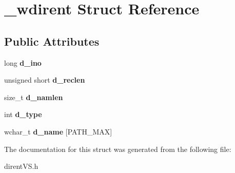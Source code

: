 \hypertarget{struct__wdirent}{}\section{\+\_\+wdirent Struct Reference}
\label{struct__wdirent}
\subsection*{Public Attributes}
\begin{DoxyCompactItemize}
\item 
long {\bfseries d\+\_\+ino}\hypertarget{struct__wdirent_ac8cfaf294a0b6a49287d3f384c280c93}{}\label{struct__wdirent_ac8cfaf294a0b6a49287d3f384c280c93}

\item 
unsigned short {\bfseries d\+\_\+reclen}\hypertarget{struct__wdirent_aff7f360608e576cd18cf11f2caf13ef3}{}\label{struct__wdirent_aff7f360608e576cd18cf11f2caf13ef3}

\item 
size\+\_\+t {\bfseries d\+\_\+namlen}\hypertarget{struct__wdirent_a0050d6131e6fa90206903e216b38799e}{}\label{struct__wdirent_a0050d6131e6fa90206903e216b38799e}

\item 
int {\bfseries d\+\_\+type}\hypertarget{struct__wdirent_a3c3874604ffccbeeaffd96709763cc3b}{}\label{struct__wdirent_a3c3874604ffccbeeaffd96709763cc3b}

\item 
wchar\+\_\+t {\bfseries d\+\_\+name} \mbox{[}P\+A\+T\+H\+\_\+\+M\+AX\mbox{]}\hypertarget{struct__wdirent_a267f915cd36cad5969337a9192cab567}{}\label{struct__wdirent_a267f915cd36cad5969337a9192cab567}

\end{DoxyCompactItemize}


The documentation for this struct was generated from the following file\+:\begin{DoxyCompactItemize}
\item 
dirent\+V\+S.\+h\end{DoxyCompactItemize}
